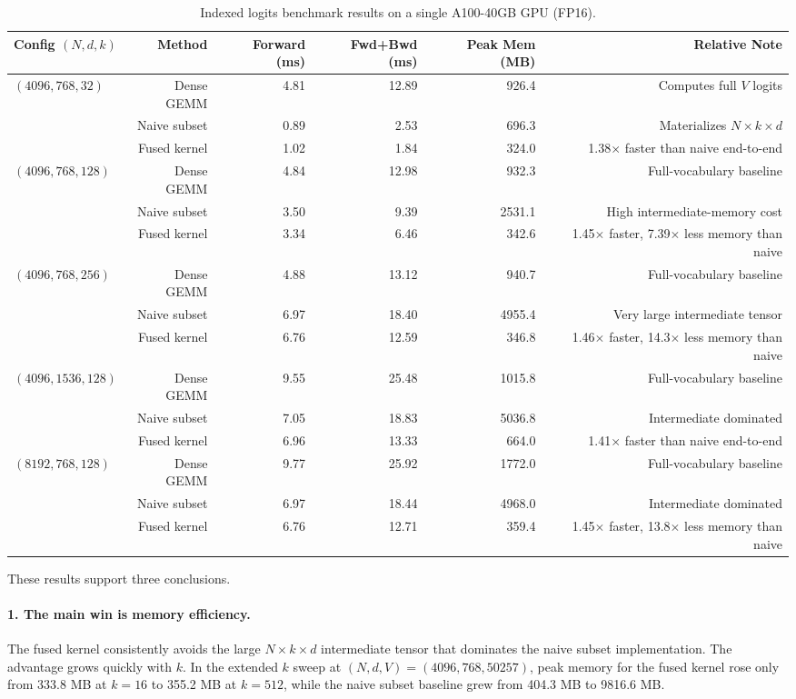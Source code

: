 \begin{table}[t]
\centering
\caption{Indexed logits benchmark results on a single A100-40GB GPU (FP16).}
\label{tab:indexed_logits_main}
\small
\begin{tabular}{lrrrrr}
\toprule
Config $(N,d,k)$ & Method & Forward (ms) & Fwd+Bwd (ms) & Peak Mem (MB) & Relative Note \\
\midrule
$(4096,768,32)$
  & Dense GEMM   & 4.81 & 12.89 & 926.4 & Computes full $V$ logits \\
  & Naive subset & 0.89 & 2.53  & 696.3 & Materializes $N \times k \times d$ \\
  & Fused kernel & 1.02 & 1.84  & 324.0 & 1.38$\times$ faster than naive end-to-end \\
\midrule
$(4096,768,128)$
  & Dense GEMM   & 4.84 & 12.98 & 932.3 & Full-vocabulary baseline \\
  & Naive subset & 3.50 & 9.39  & 2531.1 & High intermediate-memory cost \\
  & Fused kernel & 3.34 & 6.46  & 342.6 & 1.45$\times$ faster, 7.39$\times$ less memory than naive \\
\midrule
$(4096,768,256)$
  & Dense GEMM   & 4.88 & 13.12 & 940.7 & Full-vocabulary baseline \\
  & Naive subset & 6.97 & 18.40 & 4955.4 & Very large intermediate tensor \\
  & Fused kernel & 6.76 & 12.59 & 346.8 & 1.46$\times$ faster, 14.3$\times$ less memory than naive \\
\midrule
$(4096,1536,128)$
  & Dense GEMM   & 9.55 & 25.48 & 1015.8 & Full-vocabulary baseline \\
  & Naive subset & 7.05 & 18.83 & 5036.8 & Intermediate dominated \\
  & Fused kernel & 6.96 & 13.33 & 664.0 & 1.41$\times$ faster than naive end-to-end \\
\midrule
$(8192,768,128)$
  & Dense GEMM   & 9.77 & 25.92 & 1772.0 & Full-vocabulary baseline \\
  & Naive subset & 6.97 & 18.44 & 4968.0 & Intermediate dominated \\
  & Fused kernel & 6.76 & 12.71 & 359.4 & 1.45$\times$ faster, 13.8$\times$ less memory than naive \\
\bottomrule
\end{tabular}
\end{table}

These results support three conclusions.

\paragraph{1. The main win is memory efficiency.}
The fused kernel consistently avoids the large $N \times k \times d$ intermediate tensor that dominates the naive subset implementation. The advantage grows quickly with $k$. In the extended $k$ sweep at $(N,d,V)=(4096,768,50257)$, peak memory for the fused kernel rose only from 333.8 MB at $k=16$ to 355.2 MB at $k=512$, while the naive subset baseline grew from 404.3 MB to 9816.6 MB.

